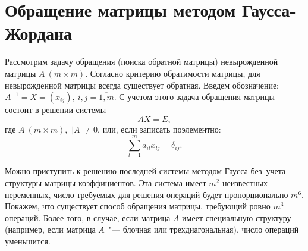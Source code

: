 \documentclass[11pt,a4paper,twoside]{report}
\numberwithin{equation}{section}
\newtheorem*{definition}{Определение}
\theoremstyle{definition}
\theoremstyle{plain}
\begin{document}
\section{Обращение матрицы методом Гаусса-Жордана}
%
Рассмотрим задачу обращения (поиска обратной матрицы) невырожденной матрицы
$A~(m \times m)$.
%
%
Согласно критерию обратимости матрицы, для невырожденной матрицы всегда
существует обратная. Введем обозначение:
$
A^{-1}=X=(x_{ij}),~i,j = \overline{1,m}.
$
С учетом этого задача обращения матрицы состоит в решении системы
%
\begin{equation}
    \label{eq:AX-system}
    AX=E,
\end{equation}
%
где $A~(m \times m)$,~$|A| \ne 0$, или, если записать поэлементно:
%
\begin{equation}
    \label{eq:AX-sum-system}
    \sum\limits_{l=1}^m a_{il}x_{lj}=\delta_{ij}.
\end{equation}
%

Можно приступить к решению последней системы методом Гаусса без~учета
структуры матрицы коэффициентов.
Эта система имеет $m^2$ неизвестных переменных, число требуемых для решения
операций будет
пропорционально $m^6$. Покажем, что существует способ обращения матрицы,
требующий ровно $m^3$ операций. Более того, в случае, если матрица $A$ имеет
специальную структуру (например, если матрица $A$~"--- блочная или
трехдиагональная), число операций уменьшится.
\end{document}
